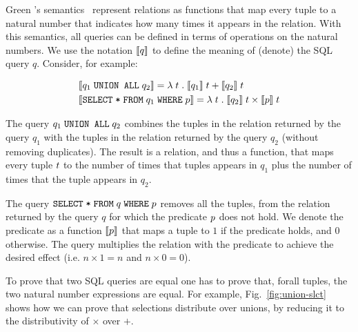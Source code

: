 Green \etal's semantics~\cite{k-relations} represent relations as functions that
map every tuple to a natural number that indicates how many times it appears
in the relation. With this semantics,
all queries can be defined in terms of operations on the natural numbers.
We use the notation $\llbracket q\rrbracket$ to define the meaning of
(denote) the SQL query $q$. Consider, for example:

\begin{align*}
  & \llbracket q_1 \; \texttt{UNION ALL} \; q_2\rrbracket =  \lambda \; {t} \;.\;{\llbracket q_1\rrbracket \; t+\llbracket q_2\rrbracket \; t} \\ 
  & \llbracket\texttt{SELECT} \; \texttt{*} \; \texttt{FROM} \; q_1 \; \texttt{WHERE} \; p\rrbracket = \lambda \; {t} \;.\;{\llbracket q_2\rrbracket \; t \times \llbracket p\rrbracket \; t} \\
\end{align*}

The query $q_1 \; \texttt{UNION ALL} \; q_2$ combines 
the tuples in the relation returned by the query $q_1$ with 
the tuples in the relation returned by the query $q_2$ (without removing duplicates).
The result is a relation,
and thus a function, that maps every tuple $t$ to the number of times 
that tuples appears in $q_1$ plus the number of times that the tuple appears in $q_2$.

The query $\texttt{SELECT} \; \texttt{*} \; \texttt{FROM} \; q \; \texttt{WHERE} \; p$ removes all the tuples, from the
relation returned by the query $q$ for which the predicate $p$ does not hold. We denote the predicate
as a function $\llbracket p\rrbracket$ that maps a tuple to $1$ if the predicate holds,
and $0$ otherwise. The query multiplies the relation with the
predicate to achieve the desired effect (i.e. $n \times 1 = n$ and $n \times 0 = 0$).

To prove that two
SQL queries are equal one has to prove that, forall tuples, the two natural number expressions
are equal. 
For example, Fig.~\ref{fig:union-slct}
shows how we can prove that selections distribute over unions, by
reducing it to the distributivity of $\times$ over $+$. 

